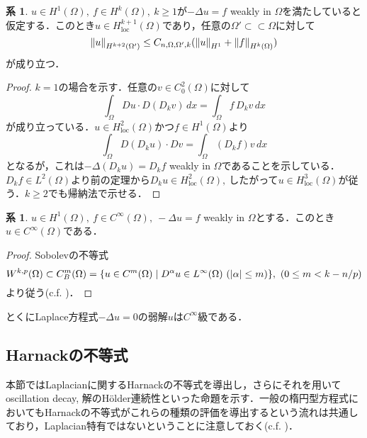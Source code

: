 \documentclass[a4paper]{ltjsarticle}
\newcommand{\Om}{\Omega}
\newcommand{\ssubset}{\subset\subset}
\newcommand{\loc}{\text{loc}}
\newcommand{\1}{\mathbbm{1}}
\numberwithin{equation}{section}
\theoremstyle{definition}
\newtheorem{cor}[thm]{系}
\begin{document}
\begin{cor}\label{cor:laplacian_regularity}
    $u\in H^1(\Om),\ f\in H^k(\Om),\ k\geq1$が$-\Delta u=f$ weakly in $\Om$を満たしていると仮定する．このとき$u\in H^{k+1}_{\loc}(\Om)$であり，任意の$\Om'\ssubset \Om$に対して 
    \begin{equation}
        \norm{u}_{H^{k+2}(\Om')}\leq C_{n,\Om,\Om',k}(\norm{u}_{H^1}+\norm{f}_{H^k(\Om)})
    \end{equation}
    が成り立つ．
\end{cor}
\begin{proof}
    $k=1$の場合を示す．任意の$v\in C^2_0(\Om)$に対して
    \begin{equation}
        \int_{\Om}Du\cdot D(D_kv)\,dx=\int_{\Om}f\,D_kv\,dx 
    \end{equation}
    が成り立っている．$u\in H^2_{\loc}(\Om)$かつ$f\in H^1(\Om)$より
    \begin{equation}
        \int_{\Om}D(D_ku)\cdot Dv = \int_{\Om}(D_kf)v\,dx
    \end{equation}
    となるが，これは$-\Delta(D_ku)=D_kf$ weakly in $\Om$であることを示している．$D_kf\in L^2(\Om)$より前の定理から$D_ku\in H^2_{\loc}(\Om),\ $したがって$u\in H^3_{\loc}(\Om)$が従う．$k\geq2$でも帰納法で示せる．
\end{proof}
\begin{cor}
    $u\in H^1(\Om),\ f\in C^\infty(\Om),\ -\Delta u=f$ weakly in $\Om$とする．このとき$u\in C^\infty(\Om)$である．
\end{cor}
\begin{proof}
    Sobolevの不等式
    \begin{equation}
        W^{k,p}(\Om)\subset C^m_B(\Om)=\qty{u\in C^m(\Om)\mid D^\alpha u\in L^\infty(\Om)\ (\abs{\alpha}\leq m)},\ (0\leq m< k-n/p)
    \end{equation}
    より従う(c.f. \cite[Corollary 7.11]{gt})．
\end{proof}
とくにLaplace方程式$-\Delta u=0$の弱解$u$は$C^\infty$級である．
\subsection{Harnackの不等式}
本節ではLaplacianに関するHarnackの不等式を導出し，さらにそれを用いてoscillation decay, 解のHölder連続性といった命題を示す．一般の楕円型方程式においてもHarnackの不等式がこれらの種類の評価を導出するという流れは共通しており，Laplacian特有ではないということに注意しておく(c.f. \cite[Chapter 8]{gt})．
\end{document}

